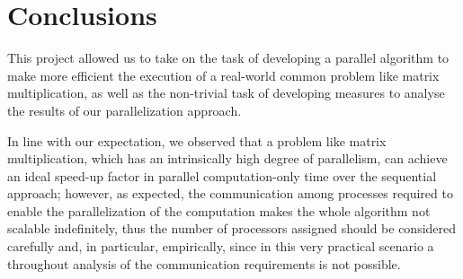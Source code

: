 \section{Conclusions}

This project allowed us to take on the task of developing a parallel algorithm to make more efficient the execution of a real-world common problem like matrix multiplication, as well as the non-trivial task of developing measures to analyse the results of our parallelization approach.

In line with our expectation, we observed that a problem like matrix multiplication, which has an intrinsically high degree of parallelism, can achieve an ideal speed-up factor in parallel computation-only time over the sequential approach; however, as expected, the communication among processes required to enable the parallelization of the computation makes the whole algorithm not scalable indefinitely, thus the number of processors assigned should be considered carefully and, in particular, empirically, since in this very practical scenario a throughout analysis of the communication requirements is not possible.